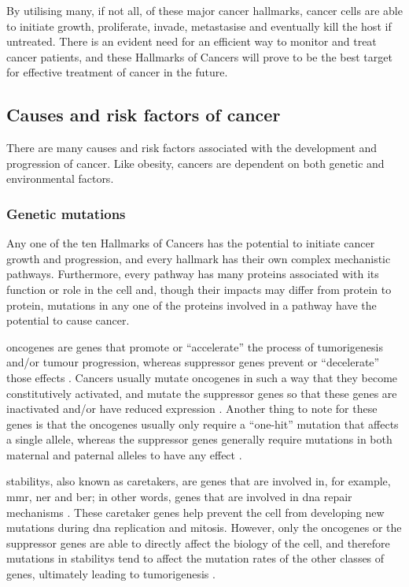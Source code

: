 \noindent
By utilising many, if not all, of these major cancer hallmarks, cancer cells are able to initiate growth, proliferate, invade, metastasise and eventually kill the host if untreated.
There is an evident need for an efficient way to monitor and treat cancer patients, and these Hallmarks of Cancers will prove to be the best target for effective treatment of cancer in the future.

\subsection{Causes and risk factors of cancer}
\label{sub:causes_and_risk_factors_of_cancer}

There are many causes and risk factors associated with the development and progression of cancer.
Like obesity, cancers are dependent on both genetic and environmental factors.

\subsubsection{Genetic mutations}
\label{ssub:Genetic mutations}

Any one of the ten Hallmarks of Cancers has the potential to initiate cancer growth and progression, and every hallmark has their own complex mechanistic pathways.
Furthermore, every pathway has many proteins associated with its function or role in the cell and, though their impacts may differ from protein to protein, mutations in any one of the proteins involved in a pathway have the potential to cause cancer.

\Glspl{oncogene} are genes that promote or ``accelerate'' the process of tumorigenesis and/or tumour progression, whereas \gls{suppressor} genes prevent or ``decelerate'' those effects \citep{Vogelstein2004a}.
Cancers usually mutate \glspl{oncogene} in such a way that they become constitutively activated, and mutate the \gls{suppressor} genes so that these genes are inactivated and/or have reduced expression \citep{Vogelstein2004a}.
Another thing to note for these genes is that the \glspl{oncogene} usually only require a ``one-hit'' mutation that affects a single allele, whereas the \gls{suppressor} genes generally require mutations in both maternal and paternal \glspl{allele} to have any effect \citep{Stratton2009,Vogelstein2004a}.

\Glspl{stability}, also known as caretakers, are genes that are involved in, for example,  \gls{mmr}, \gls{ner} and \gls{ber}; in other words, genes that are involved in \acrshort{dna} repair mechanisms \citep{Vogelstein2004a}.
These caretaker genes help prevent the cell from developing new mutations during \acrshort{dna} replication and mitosis.
However, only the \glspl{oncogene} or the \gls{suppressor} genes are able to directly affect the biology of the cell, and therefore mutations in \glspl{stability} tend to affect the mutation rates of the other classes of genes, ultimately leading to tumorigenesis \citep{Vogelstein2004a}.

